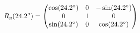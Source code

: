 \documentclass[preview]{standalone}
\begin{document}
\begin{align*}
\special{dvisvgm:raw <g id='unique000'>}R_y(24.2^\circ) = \begin{pmatrix} \cos(24.2^\circ) & 0 & -\sin(24.2^\circ) \\ 0 & 1 & 0 \\ \sin(24.2^\circ) & 0 & \cos(24.2^\circ) \end{pmatrix}\special{dvisvgm:raw </g>}
\end{align*}
\end{document}
